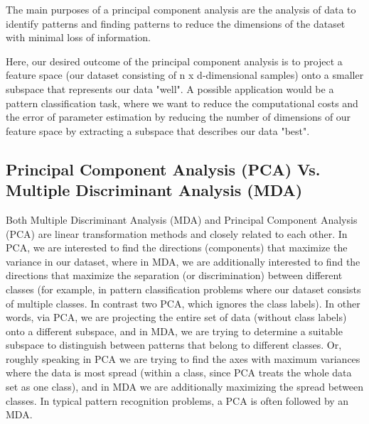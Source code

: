 
The main purposes of a principal component analysis are the analysis of data to identify patterns and finding patterns to 
reduce the dimensions of the dataset with minimal loss of information.

Here, our desired outcome of the principal component analysis is to project a feature space (our dataset consisting of 
n x d-dimensional samples) onto a smaller subspace that represents our data "well". A possible application would be a pattern 
classification task, where we want to reduce the computational costs and the error of parameter estimation by reducing the 
number of dimensions of our feature space by extracting a subspace that describes our data "best".


\subsection*{Principal Component Analysis (PCA) Vs. Multiple Discriminant Analysis (MDA)}

Both Multiple Discriminant Analysis (MDA) and Principal Component Analysis (PCA) are linear transformation methods and closely related to each other. In PCA, we are interested to find the directions (components) that maximize the variance in our dataset, where in MDA, we are additionally interested to find the directions that maximize the separation (or discrimination) between different classes (for example, in pattern classification problems where our dataset consists of multiple classes. In contrast two PCA, which ignores the class labels).
In other words, via PCA, we are projecting the entire set of data (without class labels) onto a different subspace, and in MDA, we are trying to determine a suitable subspace to distinguish between patterns that belong to different classes. Or, roughly speaking in PCA we are trying to find the axes with maximum variances where the data is most spread (within a class, since PCA treats the whole data set as one class), and in MDA we are additionally maximizing the spread between classes. 
In typical pattern recognition problems, a PCA is often followed by an MDA.

